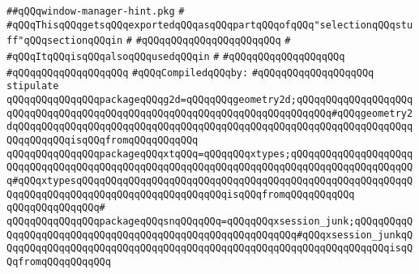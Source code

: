 \label{src/lib/x-kit/xclient/src/iccc/window-manager-hint.pkg}
\verb|##qQQqwindow-manager-hint.pkg|\newline
\verb|#|\newline
\verb|#qQQqThisqQQqgetsqQQqexportedqQQqasqQQqpartqQQqofqQQq"selectionqQQqstuff"qQQqsectionqQQqin|\newline
\verb|#|\newline
\verb|#qQQqqQQqqQQqqQQqqQQq|\verb|qQQq|\newline
\verb|#|\newline
\verb|#qQQqItqQQqisqQQqalsoqQQqusedqQQqin|\newline
\verb|#|\newline
\verb|#qQQqqQQqqQQqqQQqqQQq|\newline
\verb|#qQQqqQQqqQQqqQQqqQQq|\newline
\newline
\verb|#qQQqCompiledqQQqby:|\newline
\verb|#qQQqqQQqqQQqqQQqqQQq|\newline
\newline
\verb|stipulate|\newline
\verb|qQQqqQQqqQQqqQQqpackageqQQqg2d=qQQqqQQqgeometry2d;qQQqqQQqqQQqqQQqqQQqqQQqqQQqqQQqqQQqqQQqqQQqqQQqqQQqqQQqqQQqqQQqqQQqqQQqqQQq#qQQqgeometry2dqQQqqQQqqQQqqQQqqQQqqQQqqQQqqQQqqQQqqQQqqQQqqQQqqQQqqQQqqQQqqQQqqQQqqQQqqQQqqQQqisqQQqfromqQQqqQQqqQQq|\newline
\verb|qQQqqQQqqQQqqQQqpackageqQQqxtqQQq=qQQqqQQqxtypes;qQQqqQQqqQQqqQQqqQQqqQQqqQQqqQQqqQQqqQQqqQQqqQQqqQQqqQQqqQQqqQQqqQQqqQQqqQQqqQQqqQQqqQQqqQQq#qQQqxtypesqQQqqQQqqQQqqQQqqQQqqQQqqQQqqQQqqQQqqQQqqQQqqQQqqQQqqQQqqQQqqQQqqQQqqQQqqQQqqQQqqQQqqQQqqQQqqQQqisqQQqfromqQQqqQQqqQQq|\newline
\verb|qQQqqQQqqQQqqQQq#|\newline
\verb|qQQqqQQqqQQqqQQqpackageqQQqsnqQQqqQQq=qQQqqQQqxsession_junk;qQQqqQQqqQQqqQQqqQQqqQQqqQQqqQQqqQQqqQQqqQQqqQQqqQQqqQQqqQQq#qQQqxsession_junkqQQqqQQqqQQqqQQqqQQqqQQqqQQqqQQqqQQqqQQqqQQqqQQqqQQqqQQqqQQqqQQqqQQqisqQQqfromqQQqqQQqqQQq|\newline
